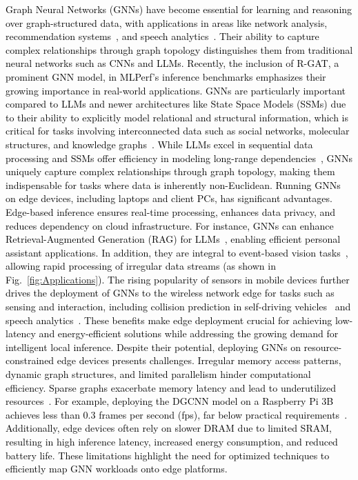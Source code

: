 \textcolor{black}{Graph Neural Networks (GNNs) have become essential for learning and reasoning over graph-structured data, with applications in areas like network analysis, recommendation systems~\cite{gnn_survey_wu}, and speech analytics~\cite{gnn_emotion}. Their ability to capture complex relationships through graph topology distinguishes them from traditional neural networks such as CNNs and LLMs. Recently, the inclusion of R-GAT, a prominent GNN model, in MLPerf's inference benchmarks emphasizes their growing importance in real-world applications.}
\textcolor{black}{GNNs are particularly important compared to LLMs and newer architectures like State Space Models (SSMs) due to their ability to explicitly model relational and structural information, which is critical for tasks involving interconnected data such as social networks, molecular structures, and knowledge graphs~\cite{bronstein2017geometric}. While LLMs excel in sequential data processing and SSMs offer efficiency in modeling long-range dependencies~\cite{gu2022efficiently}, GNNs uniquely capture complex relationships through graph topology, making them indispensable for tasks where data is inherently non-Euclidean.}
\textcolor{black}{Running GNNs on edge devices, including laptops and client PCs, has significant advantages. Edge-based inference ensures real-time processing, enhances data privacy, and reduces dependency on cloud infrastructure. For instance, GNNs can enhance Retrieval-Augmented Generation (RAG) for LLMs~\cite{gnn_rag, g_retriever}, enabling efficient personal assistant applications. In addition, they are integral to event-based vision tasks~\cite{aegnn, evgnn}, allowing rapid processing of irregular data streams (as shown in Fig.~\ref{fig:Applications}). The rising popularity of sensors in mobile devices further drives the deployment of GNNs to the wireless network edge for tasks such as sensing and interaction, including collision prediction in self-driving vehicles~\cite{gnn_autonomous} and speech analytics~\cite{gnn_emotion}. These benefits make edge deployment crucial for achieving low-latency and energy-efficient solutions while addressing the growing demand for intelligent local inference.
Despite their potential, deploying GNNs on resource-constrained edge devices presents challenges. Irregular memory access patterns, dynamic graph structures, and limited parallelism hinder computational efficiency. Sparse graphs exacerbate memory latency and lead to underutilized resources~\cite{gnn_survey_wu}. For example, deploying the DGCNN model on a Raspberry Pi 3B achieves less than 0.3 frames per second (fps), far below practical requirements~\cite{gcode}. Additionally, edge devices often rely on slower DRAM due to limited SRAM, resulting in high inference latency, increased energy consumption, and reduced battery life. These limitations highlight the need for optimized techniques to efficiently map GNN workloads onto edge platforms.}







